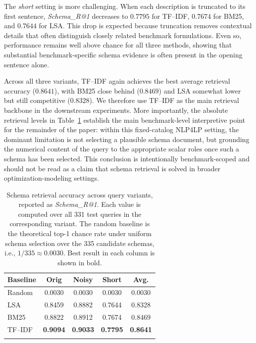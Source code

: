 \documentclass[pdflatex,sn-basic,Numbered]{sn-jnl}
\begin{document}
The \emph{short} setting is more challenging. When each description is truncated to its first sentence, \textit{Schema\_R@1} decreases to $0.7795$ for TF--IDF, $0.7674$ for BM25, and $0.7644$ for LSA. This drop is expected because truncation removes contextual details that often distinguish closely related benchmark formulations. Even so, performance remains well above chance for all three methods, showing that substantial benchmark-specific schema evidence is often present in the opening sentence alone.

Across all three variants, TF--IDF again achieves the best average retrieval accuracy ($0.8641$), with BM25 close behind ($0.8469$) and LSA somewhat lower but still competitive ($0.8328$). We therefore use TF--IDF as the main retrieval backbone in the downstream experiments. More importantly, the absolute retrieval levels in Table~\ref{tab:nlp4lp-retrieval-main} establish the main benchmark-level interpretive point for the remainder of the paper: within this fixed-catalog \textsc{NLP4LP} setting, the dominant limitation is not selecting a plausible schema document, but grounding the numerical content of the query to the appropriate scalar roles once such a schema has been selected. This conclusion is intentionally benchmark-scoped and should not be read as a claim that schema retrieval is solved in broader optimization-modeling settings.

\begin{table}[t]
  \centering
  \caption{Schema retrieval accuracy across query variants, reported as \textit{Schema\_R@1}. Each value is computed over all 331 test queries in the corresponding variant. The random baseline is the theoretical top-1 chance rate under uniform schema selection over the 335 candidate schemas, i.e., $1/335 \approx 0.0030$. Best result in each column is shown in bold.}
  \label{tab:nlp4lp-retrieval-main}
  \small
  \begin{tabular}{lcccc}
    \toprule
    Baseline & Orig & Noisy & Short & Avg. \\
    \midrule
    Random  & 0.0030 & 0.0030 & 0.0030 & 0.0030 \\
    LSA     & 0.8459 & 0.8882 & 0.7644 & 0.8328 \\
    BM25    & 0.8822 & 0.8912 & 0.7674 & 0.8469 \\
    TF--IDF & \textbf{0.9094} & \textbf{0.9033} & \textbf{0.7795} & \textbf{0.8641} \\
    \botrule
  \end{tabular}
\end{table}
\end{document}
